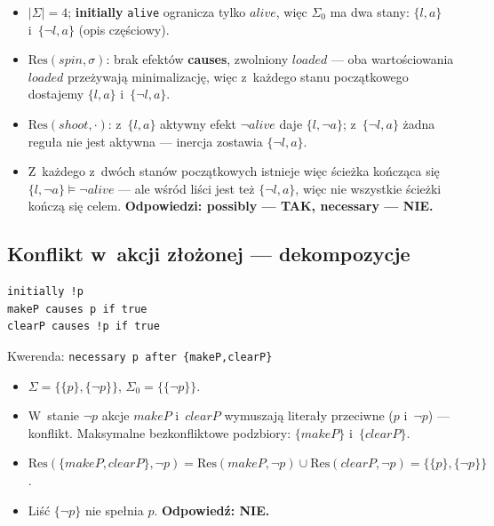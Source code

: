 \documentclass[11pt,a4paper]{article}
\newcommand{\Res}{\mathrm{Res}}
\begin{document}
\begin{itemize}
  \item $|\Sigma| = 4$; \textbf{initially} \texttt{alive} ogranicza tylko
        $\mathit{alive}$, więc $\Sigma_0$ ma dwa stany:
        $\{l, a\}$ i~$\{\lnot l, a\}$ (opis częściowy).
  \item $\Res(\mathit{spin},\sigma)$: brak efektów \textbf{causes}, zwolniony
        $\mathit{loaded}$ --- oba wartościowania $\mathit{loaded}$ przeżywają
        minimalizację, więc z~każdego stanu początkowego dostajemy
        $\{l,a\}$ i~$\{\lnot l,a\}$.
  \item $\Res(\mathit{shoot},\cdot)$: z~$\{l,a\}$ aktywny efekt
        $\lnot\mathit{alive}$ daje $\{l,\lnot a\}$; z~$\{\lnot l,a\}$ żadna
        reguła nie jest aktywna --- inercja zostawia $\{\lnot l,a\}$.
  \item Z~każdego z~dwóch stanów początkowych istnieje więc ścieżka kończąca
        się $\{l,\lnot a\} \models \lnot\mathit{alive}$ --- ale wśród liści jest
        też $\{\lnot l, a\}$, więc nie wszystkie ścieżki kończą się celem.
        \textbf{Odpowiedzi: possibly --- TAK, necessary --- NIE.}
\end{itemize}

\subsection{Konflikt w~akcji złożonej --- dekompozycje}

\begin{verbatim}
initially !p
makeP causes p if true
clearP causes !p if true
\end{verbatim}
Kwerenda: \texttt{necessary p after \{makeP,clearP\}}

\begin{itemize}
  \item $\Sigma = \{\{p\},\{\lnot p\}\}$, $\Sigma_0 = \{\{\lnot p\}\}$.
  \item W~stanie $\lnot p$ akcje $\mathit{makeP}$ i~$\mathit{clearP}$ wymuszają
        literały przeciwne ($p$ i~$\lnot p$) --- konflikt. Maksymalne
        bezkonfliktowe podzbiory: $\{\mathit{makeP}\}$ i~$\{\mathit{clearP}\}$.
  \item $\Res(\{\mathit{makeP},\mathit{clearP}\}, \lnot p)
        = \Res(\mathit{makeP},\lnot p) \cup \Res(\mathit{clearP},\lnot p)
        = \{\{p\},\{\lnot p\}\}$.
  \item Liść $\{\lnot p\}$ nie spełnia $p$. \textbf{Odpowiedź: NIE.}
\end{itemize}
\end{document}
